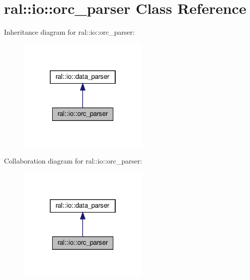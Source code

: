 \hypertarget{classral_1_1io_1_1orc__parser}{}\section{ral\+:\+:io\+:\+:orc\+\_\+parser Class Reference}
\label{classral_1_1io_1_1orc__parser}


Inheritance diagram for ral\+:\+:io\+:\+:orc\+\_\+parser\+:\nopagebreak
\begin{figure}[H]
\begin{center}
\leavevmode
\includegraphics[width=178pt]{classral_1_1io_1_1orc__parser__inherit__graph}
\end{center}
\end{figure}


Collaboration diagram for ral\+:\+:io\+:\+:orc\+\_\+parser\+:\nopagebreak
\begin{figure}[H]
\begin{center}
\leavevmode
\includegraphics[width=178pt]{classral_1_1io_1_1orc__parser__coll__graph}
\end{center}
\end{figure}
